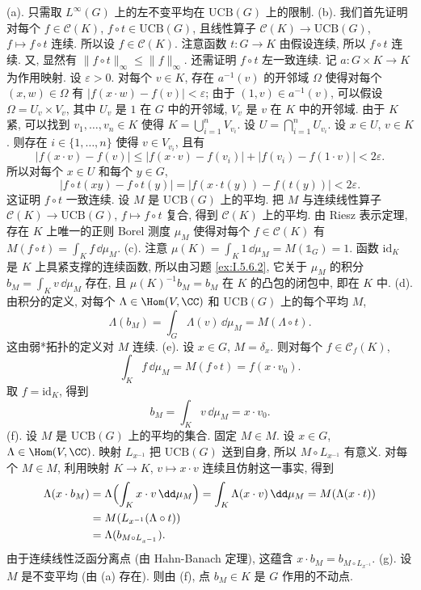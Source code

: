 \begin{solution}
(a). 只需取 $L^{\infty}(G)$ 上的左不变平均在 $\mathrm{UCB}(G)$ 上的限制.
(b). 我们首先证明对每个 $f \in \mathcal{C}(K)$, $f \circ t \in \mathrm{UCB}(G)$, 且线性算子 $\mathcal{C}(K) \to \mathrm{UCB}(G)$, $f \longmapsto f \circ t$ 连续. 所以设 $f \in \mathcal{C}(K)$. 注意函数 $t \colon G \to K$ 由假设连续, 所以 $f \circ t$ 连续. 又, 显然有 $\|f \circ t\|_{\infty} \leq \|f\|_{\infty}$. 还需证明 $f \circ t$ 左一致连续. 记 $a \colon G \times K \to K$ 为作用映射. 设 $\varepsilon > 0$. 对每个 $v \in K$, 存在 $a^{-1}(v)$ 的开邻域 $\Omega$ 使得对每个 $(x, w) \in \Omega$ 有 $|f(x \cdot w) - f(v)| < \varepsilon$; 由于 $(1, v) \in a^{-1}(v)$, 可以假设 $\Omega = U_v \times V_v$, 其中 $U_v$ 是 $1$ 在 $G$ 中的开邻域, $V_v$ 是 $v$ 在 $K$ 中的开邻域. 由于 $K$ 紧, 可以找到 $v_1, \ldots, v_n \in K$ 使得 $K = \bigcup_{i=1}^n V_{v_i}$. 设 $U = \bigcap_{i=1}^n U_{v_i}$. 设 $x \in U$, $v \in K$. 则存在 $i \in \{1, \ldots, n\}$ 使得 $v \in V_{v_i}$, 且有
\[
|f(x \cdot v) - f(v)| \leq |f(x \cdot v) - f(v_i)| + |f(v_i) - f(1 \cdot v)| < 2\varepsilon.
\]
所以对每个 $x \in U$ 和每个 $y \in G$,
\[
|f \circ t(xy) - f \circ t(y)| = |f(x \cdot t(y)) - f(t(y))| < 2\varepsilon.
\]
这证明 $f \circ t$ 一致连续.
设 $M$ 是 $\mathrm{UCB}(G)$ 上的平均. 把 $M$ 与连续线性算子 $\mathcal{C}(K) \to \mathrm{UCB}(G)$, $f \longmapsto f \circ t$ 复合, 得到 $\mathcal{C}(K)$ 上的平均. 由 Riesz 表示定理, 存在 $K$ 上唯一的正则 Borel 测度 $\mu_M$ 使得对每个 $f \in \mathcal{C}(K)$ 有 $M(f \circ t) = \int_K f\,\dd\mu_M$.
(c). 注意 $\mu(K) = \int_K 1\,\dd\mu_M = M(\mathbb{1}_G) = 1$. 函数 $\mathrm{id}_K$ 是 $K$ 上具紧支撑的连续函数, 所以由习题 \ref{ex:I.5.6.2}, 它关于 $\mu_M$ 的积分 $b_M = \int_K v\,\dd\mu_M$ 存在, 且 $\mu(K)^{-1}b_M = b_M$ 在 $K$ 的凸包的闭包中, 即在 $K$ 中.
(d). 由积分的定义, 对每个 $\Lambda \in \Hom(V, \CC)$ 和 $\mathrm{UCB}(G)$ 上的每个平均 $M$,
\[
\Lambda(b_M) = \int_G \Lambda(v)\,\dd\mu_M = M(\Lambda \circ t).
\]
这由弱*拓扑的定义对 $M$ 连续.
(e). 设 $x \in G$, $M = \delta_x$. 则对每个 $f \in \mathcal{C}_f(K)$,
\[
\int_K f\,\dd\mu_M = M(f \circ t) = f(x \cdot v_0).
\]
取 $f = \mathrm{id}_K$, 得到
\[
b_M = \int_K v\,\dd\mu_M = x \cdot v_0.
\]
(f). 设 $M$ 是 $\mathrm{UCB}(G)$ 上的平均的集合. 固定 $M \in M$. 设 $x \in G$, $\Lambda \in \Hom(V, \CC)$. 映射 $L_{x^{-1}}$ 把 $\mathrm{UCB}(G)$ 送到自身, 所以 $M \circ L_{x^{-1}}$ 有意义. 对每个 $M \in M$, 利用映射 $K \to K$, $v \longmapsto x \cdot v$ 连续且仿射这一事实, 得到
\begin{align*}
\Lambda(x \cdot b_M) &= \Lambda\Bigl(\int_K x \cdot v\,\dd\mu_M\Bigr) = \int_K \Lambda(x \cdot v)\,\dd\mu_M = M(\Lambda(x \cdot t)) \\
&= M(L_{x^{-1}}(\Lambda \circ t)) \\
&= \Lambda(b_{M \circ L_{x^{-1}}}).
\end{align*}
由于连续线性泛函分离点 (由 Hahn-Banach 定理), 这蕴含 $x \cdot b_M = b_{M \circ L_{x^{-1}}}$.
(g). 设 $M$ 是不变平均 (由 (a) 存在). 则由 (f), 点 $b_M \in K$ 是 $G$ 作用的不动点.
\end{solution}

